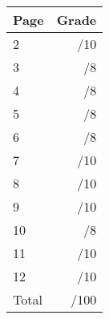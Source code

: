 \documentclass[12pt]{article}
\newcommand{\skipline}{\vspace{12pt}}
\begin{document}
\begin{table}[hbt]
\begin{center}
\begin{tabular}{|l|r|} \hline
Page&Grade\\
\hline \hline
\cline{1-2} 2 & \enspace\enspace\enspace\enspace\enspace\enspace/10\\
\cline{1-2} 3 & \enspace\enspace\enspace\enspace\enspace\enspace/8\\
\cline{1-2} 4 & \enspace\enspace\enspace\enspace\enspace\enspace/8\\
\cline{1-2} 5 & \enspace\enspace\enspace\enspace\enspace\enspace/8\\
\cline{1-2} 6 & \enspace\enspace\enspace\enspace\enspace\enspace/8\\
\cline{1-2} 7 & \enspace\enspace\enspace\enspace\enspace\enspace/10\\
\cline{1-2} 8 & \enspace\enspace\enspace\enspace\enspace\enspace/10\\
\cline{1-2} 9 & \enspace\enspace\enspace\enspace\enspace\enspace/10\\
\cline{1-2} 10 & \enspace\enspace\enspace\enspace\enspace\enspace/8\\
\cline{1-2} 11 & \enspace\enspace\enspace\enspace\enspace\enspace/10\\
\cline{1-2} 12 & \enspace\enspace\enspace\enspace\enspace\enspace/10\\
\cline{1-2} Total & \enspace\enspace\enspace\enspace\enspace\enspace/100\\
\hline
\end{tabular}

\skipline

\skipline

\skipline

\end{center}
\end{table}
\newpage
\end{document}
